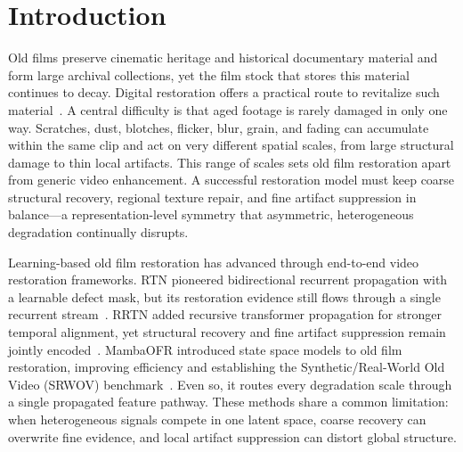 \documentclass[symmetry,article,submit,pdftex,moreauthors]{Definitions/mdpi}
\begin{document}
%
\section{Introduction}
\label{sec:introduction}

Old films preserve cinematic heritage and historical documentary material and form large archival collections, yet the film stock that stores this material continues to decay. Digital restoration offers a practical route to revitalize such material~\cite{iizuka2019deepremaster}. A central difficulty is that aged footage is rarely damaged in only one way. Scratches, dust, blotches, flicker, blur, grain, and fading can accumulate within the same clip and act on very different spatial scales, from large structural damage to thin local artifacts. This range of scales sets old film restoration apart from generic video enhancement. A successful restoration model must keep coarse structural recovery, regional texture repair, and fine artifact suppression in balance---a representation-level symmetry that asymmetric, heterogeneous degradation continually disrupts.

Learning-based old film restoration has advanced through end-to-end video restoration frameworks. RTN pioneered bidirectional recurrent propagation with a learnable defect mask, but its restoration evidence still flows through a single recurrent stream~\cite{wan2022rtn}. RRTN added recursive transformer propagation for stronger temporal alignment, yet structural recovery and fine artifact suppression remain jointly encoded~\cite{lin2024rrtn}. MambaOFR introduced state space models to old film restoration, improving efficiency and establishing the Synthetic/Real-World Old Video (SRWOV) benchmark~\cite{mao2025mambaofr,gu2024mamba,guo2024mambair}. Even so, it routes every degradation scale through a single propagated feature pathway. These methods share a common limitation: when heterogeneous signals compete in one latent space, coarse recovery can overwrite fine evidence, and local artifact suppression can distort global structure.
\end{document}
